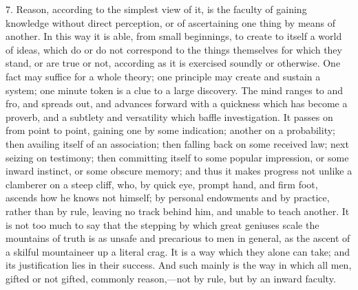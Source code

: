 7. Reason, according to the simplest view of it, is the faculty of
gaining knowledge without direct perception, or of ascertaining one
thing by means of another. In this way it is able, from small
beginnings, to create to itself a world of ideas, which do or do not
correspond to the things themselves for which they stand, or are true
or not, according as it is exercised soundly or otherwise. One fact
may suffice for a whole theory; one principle may create and sustain a
system; one minute token is a clue to a large discovery. The mind
ranges to and fro, and spreads out, and advances forward with a
quickness which has become a proverb, and a subtlety and versatility
which baffle investigation. It passes on from point to point, gaining
one by some indication; another on a probability; then availing itself
of an association; then falling back on some received law; next
seizing on testimony; then committing itself to some popular
impression, or some inward instinct, or some obscure memory; and thus
it makes progress not unlike a clamberer on a steep cliff, who, by
quick eye, prompt hand, and firm foot, ascends how he knows not
himself; by personal endowments and by practice, rather than by rule,
leaving no track behind him, and unable to teach another. It is not
too much to say that the stepping by which great geniuses scale the
mountains of truth is as unsafe and precarious to men in general, as
the ascent of a skilful mountaineer up a literal crag. It is a way
which they alone can take; and its justification lies in their
success. And such mainly is the way in which all men, gifted or not
gifted, commonly reason,—not by rule, but by an inward faculty.

